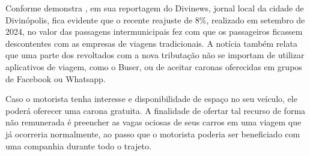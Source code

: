 Conforme demonstra , em sua reportagem do Divinews, jornal local da cidade de Divinópolis, fica evidente que o recente reajuste de 8\%, realizado em setembro de 2024, no valor das passagens intermunicipais fez com que os passageiros ficassem descontentes  com as empresas de viagens tradicionais. A notícia também relata que uma parte dos revoltados com a nova tributação não se importam de utilizar aplicativos de viagem, como o Buser, ou de aceitar caronas oferecidas em grupos de Facebook ou Whatsapp.

Caso o motorista tenha interesse e disponibilidade de espaço no seu veículo, ele poderá oferecer uma carona gratuita. A finalidade de ofertar tal recurso de forma não remunerada é preencher as vagas ociosas de seus carros em uma viagem que já ocorreria normalmente, ao passo que o motorista poderia ser beneficiado com uma companhia durante todo o trajeto.



